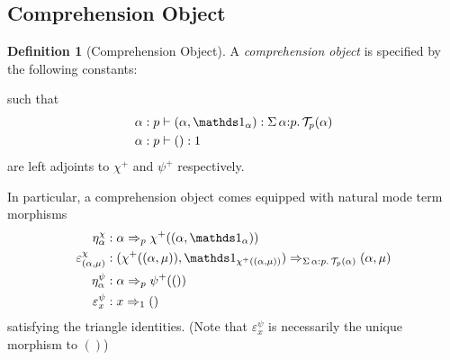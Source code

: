 \documentclass[10pt]{article}
\theoremstyle{definition}
\newtheorem{definition}{Definition}
\newcommand{\yields}{\vdash}
\newcommand{\tcell}{\Rightarrow}
\newcommand{\type}{\,\,\mathsf{mode}}
\newcommand{\sigmacl}[3]{\ensuremath{\textnormal{$\Sigma$}\,#1{:}#2.\,#3}}
\newcommand\TypeTwo[4]{\ensuremath{#1 \vdash #2 :  #3 \tcell #4}}
\newcommand\TrPlus[2]{\ensuremath{{#1}^+(#2)}}
\newcommand\El[2]{\mathcal{T}_{#1}(#2)}
\begin{document}
\subsection{Comprehension Object}
\newcommand\var[1]{\ensuremath{\mathtt{var}_{#1}}}
\newcommand\ApOne[1]{\ensuremath{\One_{\langle {#1} \rangle }}}

\begin{definition}[Comprehension Object]\label{def:comprehension-object}
  A \emph{comprehension object} is specified by the following
  constants:
  such that
\begin{align*}
\alpha : p &\yields (\alpha, \One_\alpha) : \sigmacl{\alpha}{p}{\El{p}{\alpha}} \\
\alpha : p &\yields () : 1
\end{align*}
are left adjoints to $\chi^+$ and $\psi^+$ respectively.
\end{definition}

In particular, a comprehension object comes equipped with natural mode term morphisms
\begin{align*}
\eta^\chi_\alpha {}&: \alpha \tcell_p \TrPlus{\chi}{(\alpha, \One_\alpha)} \\
\varepsilon^\chi_{(\alpha, \mu)} {}&: (\TrPlus{\chi}{(\alpha, \mu)}, \One_{\TrPlus{\chi}{(\alpha, \mu)}}) \tcell_{\sigmacl{\alpha}{p}{\El{p}{\alpha}}} (\alpha, \mu) \\
\eta^\psi_\alpha {}&: \alpha \tcell_p \TrPlus{\psi}{()} \\
\varepsilon^\psi_{x} {}&: x \tcell_1 ()
\end{align*}
satisfying the triangle identities. (Note that $\varepsilon^\psi_x$ is necessarily the unique morphism to $()$)
\end{document}
